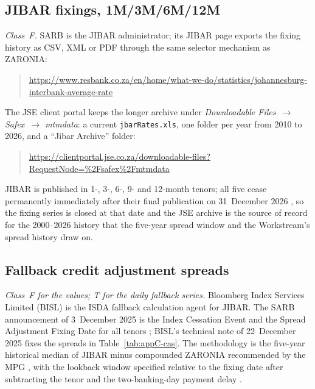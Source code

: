 \subsection{JIBAR fixings, 1M/3M/6M/12M}\label{sec:appC-jibar}

\emph{Class~F.} SARB is the JIBAR administrator; its JIBAR page exports the fixing history as CSV, XML or PDF through the same selector mechanism as ZARONIA:
\begin{quote}\footnotesize\raggedright\url{https://www.resbank.co.za/en/home/what-we-do/statistics/johannesburg-interbank-average-rate}
\end{quote}
The JSE client portal keeps the longer archive under \emph{Downloadable Files~$\to$ Safex~$\to$ mtmdata}: a current \texttt{jbarRates.xls}, one folder per year from 2010 to 2026, and a ``Jibar Archive'' folder:
\begin{quote}\footnotesize\raggedright\url{https://clientportal.jse.co.za/downloadable-files?RequestNode=%2Fsafex%2Fmtmdata}
\end{quote}
JIBAR is published in 1-, 3-, 6-, 9- and 12-month tenors; all five cease permanently immediately after their final publication on 31~December 2026 \citep[p.~1]{isda2025}, so the fixing series is closed at that date and the JSE archive is the source of record for the 2000--2026 history that the five-year spread window and the Workstream's spread history draw on.


\subsection{Fallback credit adjustment spreads}\label{sec:appC-cas}

\emph{Class~F for the values; T for the daily fallback series.} Bloomberg Index Services Limited (BISL) is the ISDA fallback calculation agent for JIBAR. The SARB announcement of 3~December 2025 is the Index Cessation Event and the Spread Adjustment Fixing Date for all tenors \citep[Sect.~1.1]{isda2025}; BISL's technical note of 22~December 2025 \citep[p.~1]{bisl2025} fixes the spreads in Table~\ref{tab:appC-cas}. The methodology is the five-year historical median of JIBAR minus compounded ZARONIA recommended by the MPG \citep[\S1, p.~3]{sarb2025fallback}, with the lookback window specified relative to the fixing date after subtracting the tenor and the two-banking-day payment delay \citep[\S4.1, p.~7]{sarb2025fallback}.

